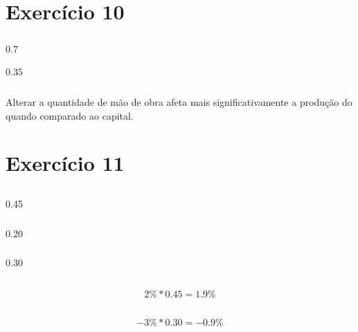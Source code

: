 \documentclass{article}
\begin{document}
\section{Exercício 10}
\subsection{}

\subsubsection{}
\(0.7\)

\subsubsection{}
\(0.35\)

\subsection{}

Alterar a quantidade de mão de obra afeta mais significativamente a produção do
quando comparado ao capital.

\section{Exercício 11}
\subsection{}
\subsubsection{}
0.45
\subsubsection{}
0.20
\subsubsection{}
0.30

\subsection{}
\[
	2\% * 0.45 = 1.9\%
\]

\subsection{}
\[
	-3\% * 0.30 = -0.9\%
\]
\end{document}
